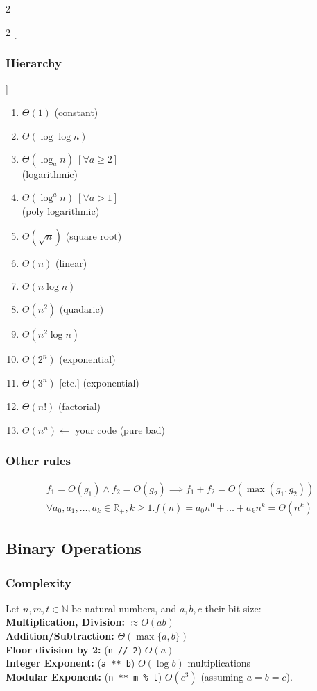 \documentclass[]{article}
\newcommand\N     {\mathbb{N}}
\newcommand\R     {\mathbb{R}}
\newcommand\logn  {\log n}
\begin{document}
\begin{multicols}{2}
		\begin{multicols}{2}
			[\subsubsection{Hierarchy}]
			\begin{enumerate}
				\item $ \Theta(1) $ (constant)
				\item $ \Theta(\log \logn) $ 
				\item $ \Theta(\log_a n) \ [\forall a \ge 2] $ \\ (logarithmic)
				\item $ \Theta(\log^a n) \ [\forall a > 1] $ \\ (poly logarithmic)
				\item $ \Theta(\sqrt{n}) $ (square root)
				\item $ \Theta(n) $ (linear)
				\item $ \Theta(n \log n) $
				\item $ \Theta(n^2) $ (quadaric)
				\item $ \Theta(n^2 \log n) $
				\item $ \Theta(2^n) $ (exponential)
				\item $ \Theta(3^n) $ [etc.] (exponential)
				\item $ \Theta(n!) $ (factorial)
				\item $ \Theta(n^n) \leftarrow $ your code (pure bad)
			\end{enumerate}
		\end{multicols}
		\subsubsection{Other rules}
		\begin{gather*}
			f_1 = O(g_1) \land f_2 = O(g_2) \implies f_1 + f_2 = O(\max(g_1, g_2)) \\
			\forall a_0, a_1, \dots, a_k \in \R_+, k \ge 1. f(n) = a_0n^0 + \dots + a_kn^k = \Theta(n^k)
		\end{gather*}
		
		\subsection{Binary Operations}
		\subsubsection{Complexity}
		Let $ n, m, t \in \N $ be natural numbers, and $ a, b, c $ their bit size: \\
		\textbf{Multiplication, Division: }$ \approx O(ab) $ \\
		\textbf{Addition/Subtraction: }$ \Theta(\max\{a, b\}) $ \\
		\textbf{Floor division by 2: }(\texttt{n // 2}) $ O(a) $ \\
		\textbf{Integer Exponent: }(\texttt{a ** b}) $ O(\log b) $ multiplications \\ 
		\textbf{Modular Exponent: }(\texttt{n ** m \% t}) $ O(c^3) $ (assuming $ a = b = c $). 

\end{multicols}
\end{document}
